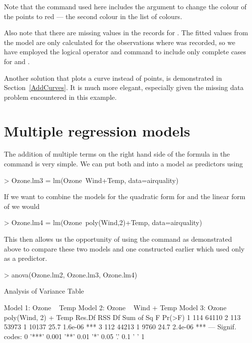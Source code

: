 Note that the  command used here includes the  argument to change the colour of the points to red --- the second colour in the list of colours.  
 
Also note that there are missing values in the records for . The fitted values from the model are only calculated for the observations where  was recorded, so we have employed the \Rcmd{!} logical operator and  command to include only complete cases for  and . 
 
Another solution that plots a curve instead of points, is demonstrated in Section~\ref{AddCurves}. It is much more elegant, especially given the missing data problem encountered in this example. 
 
 
 
\section{Multiple regression models} 
 
The addition of multiple terms on the right hand side of the formula in the  command is very simple. We can put both  and  into a model as predictors using 
\begin{Schunk}
\begin{Sinput}
> Ozone.lm3 = lm(Ozone~Wind+Temp, data=airquality) 
\end{Sinput}
\end{Schunk}
If we want to combine the models for the quadratic form for  and the linear form of  we would 
\begin{Schunk}
\begin{Sinput}
> Ozone.lm4 = lm(Ozone~poly(Wind,2)+Temp, data=airquality) 
\end{Sinput}
\end{Schunk}
This then allows us the opportunity of using the  command as demonstrated above to compare these two models and one constructed earlier which used only  as a predictor. 
\begin{Schunk}
\begin{Sinput}
> anova(Ozone.lm2, Ozone.lm3, Ozone.lm4) 
\end{Sinput}
\begin{Soutput}
Analysis of Variance Table

Model 1: Ozone ~ Temp
Model 2: Ozone ~ Wind + Temp
Model 3: Ozone ~ poly(Wind, 2) + Temp
  Res.Df   RSS Df Sum of Sq    F  Pr(>F)    
1    114 64110                              
2    113 53973  1     10137 25.7 1.6e-06 ***
3    112 44213  1      9760 24.7 2.4e-06 ***
---
Signif. codes:  
0 '***' 0.001 '**' 0.01 '*' 0.05 '.' 0.1 ' ' 1
\end{Soutput}
\end{Schunk}
 

